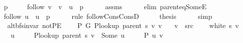 \begin{isabellebody}
\ p\ \isanewline
\ \ \ \ {\isachardoublequoteopen}follow\ v\ {\isacharequal}{\kern0pt}\ v\ {\isacharhash}{\kern0pt}\ u\ {\isacharhash}{\kern0pt}\ p{\isachardoublequoteclose}\isanewline
\ \ \ \ \isamarkupfalse%
\ assms\isanewline
\ \ \ \ \isamarkupfalse%
\ {\isacharparenleft}{\kern0pt}elim\ parent{\isacharunderscore}{\kern0pt}eq{\isacharunderscore}{\kern0pt}SomeE{\isacharparenright}{\kern0pt}\isanewline
\ \ \isamarkupfalse%
\ \isamarkupfalse%
\ {\isachardoublequoteopen}follow\ u\ {\isacharequal}{\kern0pt}\ u\ {\isacharhash}{\kern0pt}\ p{\isachardoublequoteclose}\isanewline
\ \ \ \ \isamarkupfalse%
\ {\isacharparenleft}{\kern0pt}rule\ follow{\isacharunderscore}{\kern0pt}Cons{\isacharunderscore}{\kern0pt}ConsD{\isacharparenleft}{\kern0pt}{}{\isacharparenright}{\kern0pt}{\isacharparenright}{\kern0pt}\isanewline
\ \ \isamarkupfalse%
\ \isamarkupfalse%
\ {\isacharquery}{\kern0pt}thesis\isanewline
\ \ \ \ \isamarkupfalse%
\ simp\isanewline
{}\isamarkupfalse%
%
\endisatagproof
{\isafoldproof}%
%
\isadelimproof
\isanewline
%
\endisadelimproof
\isanewline
{}\isamarkupfalse%
\ {\isacharparenleft}{\kern0pt}\ alt{\isacharunderscore}{\kern0pt}bfs{\isacharunderscore}{\kern0pt}invar{\isacharparenright}{\kern0pt}\ not{\isacharunderscore}{\kern0pt}P{\isacharprime}{\kern0pt}E{\isacharcolon}{\kern0pt}\isanewline
\ \ \ {\isachardoublequoteopen}{\isasymnot}\ P{\isacharprime}{\kern0pt}\ G{}\ {\isacharparenleft}{\kern0pt}P{\isacharunderscore}{\kern0pt}lookup\ {\isacharparenleft}{\kern0pt}parent\ s{\isacharparenright}{\kern0pt}\ v{\isacharparenright}{\kern0pt}\ v{\isachardoublequoteclose}\isanewline
\ \ \ {\isachardoublequoteopen}v\ {\isasymnoteq}\ src{\isachardoublequoteclose}\isanewline
\ \ \ {\isachardoublequoteopen}{\isasymnot}\ white\ s\ v{\isachardoublequoteclose}\isanewline
\ \ \ u\ \isanewline
\ \ \ \ {\isachardoublequoteopen}P{\isacharunderscore}{\kern0pt}lookup\ {\isacharparenleft}{\kern0pt}parent\ s{\isacharparenright}{\kern0pt}\ v\ {\isacharequal}{\kern0pt}\ Some\ u{\isachardoublequoteclose}\isanewline
\ \ \ \ {\isachardoublequoteopen}{\isasymnot}\ P{\isacharprime}{\kern0pt}{\isacharprime}{\kern0pt}\ {\isacharbraceleft}{\kern0pt}u{\isacharcomma}{\kern0pt}\ v{\isacharbraceright}{\kern0pt}{\isachardoublequoteclose}\isanewline
%
\isadelimproof
\ \ %

\end{isabellebody}
